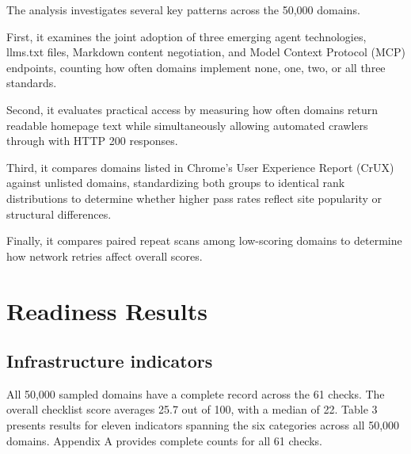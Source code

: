 \documentclass{article}
\begin{document}
The analysis investigates several key patterns across the 50,000 domains.

First, it examines the joint adoption of three emerging agent technologies, llms.txt files, Markdown content negotiation, and Model Context Protocol (MCP) endpoints, counting how often domains implement none, one, two, or all three standards.

Second, it evaluates practical access by measuring how often domains return readable homepage text while simultaneously allowing automated crawlers through with HTTP 200 responses.

Third, it compares domains listed in Chrome's User Experience Report (CrUX) against unlisted domains, standardizing both groups to identical rank distributions to determine whether higher pass rates reflect site popularity or structural differences.

Finally, it compares paired repeat scans among low-scoring domains to determine how network retries affect overall scores.

\section{Readiness Results}

\subsection{Infrastructure indicators}

All 50,000 sampled domains have a complete record across the 61 checks. The overall checklist score averages 25.7 out of 100, with a median of 22. Table 3 presents results for eleven indicators spanning the six categories across all 50,000 domains. Appendix A provides complete counts for all 61 checks.
\end{document}
